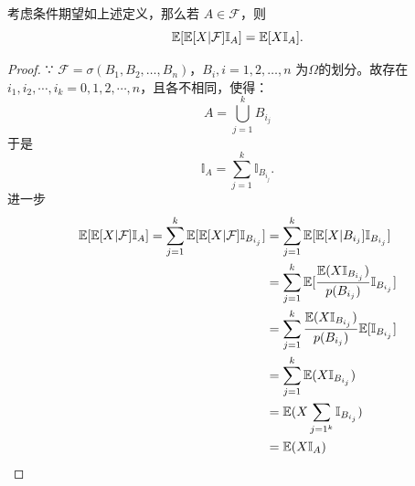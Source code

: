 考虑条件期望如上述定义，那么若 \( A \in \mathcal{F} \)，则
\[
\mathbb E[\mathbb E[X|\mathcal{F}]\mathbb{I}_A] = \mathbb E[X\mathbb{I}_A].
\]
\begin{proof}
∵ \(\mathcal{F} = \sigma(B_1, B_2, \ldots, B_n)\)，\(B_i, i=1, 2, \ldots, n\) 为$\Omega$的划分。故存在 \(i_1, i_2, \cdots, i_k = 0, 1, 2, \cdots, n\)，且各不相同，使得：
\[
A = \bigcup_{j=1}^k B_{i_j}
\]
于是
\[
\mathbb{I}_A = \sum_{j=1}^k \mathbb{I}_{B_{i_j}}.
\]
进一步
\[
\begin{aligned}
    \mathbb E[\mathbb E[X|\mathcal{F}]\mathbb{I}_A] = \sum_{j=1}^k \mathbb E[\mathbb E[X|\mathcal{F}]\mathbb{I}_{B_{i_j}}]&=\sum_{j=1}^k \mathbb E[\mathbb E[X|B_{i_j}]\mathbb{I}_{B_{i_j}}]\\
    &=\sum_{j=1}^k \mathbb E[\frac{\mathbb E(X\mathbb{I}_{B_{i_j}})}{p(B_{i_j})}\mathbb{I}_{B_{i_j}}]\\
    &=\sum_{j=1}^k \frac{\mathbb E(X\mathbb{I}_{B_{i_j}})}{p(B_{i_j})}\mathbb E[\mathbb{I}_{B_{i_j}}]\\
    &=\sum_{j=1}^k \mathbb E(X\mathbb{I}_{B_{i_j}})\\
    &=\mathbb E(X\sum_{j=1^k}\mathbb{I}_{B_{i_j}})\\
    &=\mathbb E(X\mathbb{I}_A)
\end{aligned}
\]
\end{proof}
